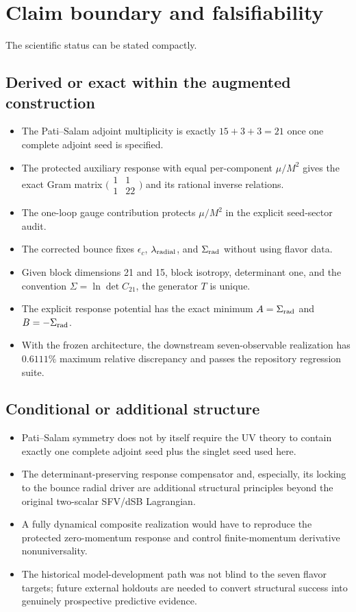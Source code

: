 \documentclass[11pt]{article}
\begin{document}
\section{Claim boundary and falsifiability}

The scientific status can be stated compactly.

\subsection*{Derived or exact within the augmented construction}
\begin{itemize}
\item The Pati--Salam adjoint multiplicity is exactly $15+3+3=21$ once one complete adjoint seed is specified.
\item The protected auxiliary response with equal per-component $\mu/M^2$ gives the exact Gram matrix $\bigl(\begin{smallmatrix}1&1\\1&22\end{smallmatrix}\bigr)$ and its rational inverse relations.
\item The one-loop gauge contribution protects $\mu/M^2$ in the explicit seed-sector audit.
\item The corrected bounce fixes $\epsilon_c$, $\lambda_{\rm radial}$, and $\Sigma_{\rm rad}$ without using flavor data.
\item Given block dimensions 21 and 15, block isotropy, determinant one, and the convention $\Sigma=\ln\det C_{21}$, the generator $T$ is unique.
\item The explicit response potential has the exact minimum $A=\Sigma_{\rm rad}$ and $B=-\Sigma_{\rm rad}$.
\item With the frozen architecture, the downstream seven-observable realization has $0.6111\%$ maximum relative discrepancy and passes the repository regression suite.
\end{itemize}

\subsection*{Conditional or additional structure}
\begin{itemize}
\item Pati--Salam symmetry does not by itself require the UV theory to contain exactly one complete adjoint seed plus the singlet seed used here.
\item The determinant-preserving response compensator and, especially, its locking to the bounce radial driver are additional structural principles beyond the original two-scalar SFV/dSB Lagrangian.
\item A fully dynamical composite realization would have to reproduce the protected zero-momentum response and control finite-momentum derivative nonuniversality.
\item The historical model-development path was not blind to the seven flavor targets; future external holdouts are needed to convert structural success into genuinely prospective predictive evidence.
\end{itemize}
\end{document}
